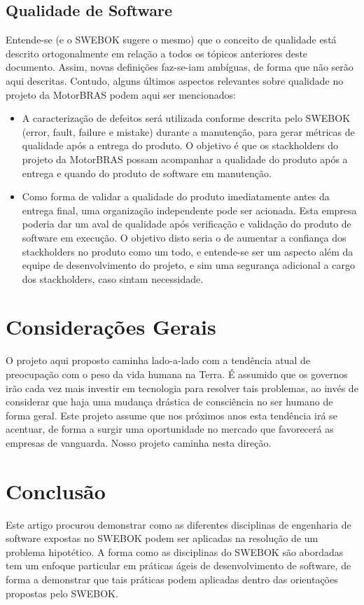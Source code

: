 \documentclass[12pt,journal,compsoc]{IEEEtran}
\begin{document}
\subsection{Qualidade de Software}

Entende-se (e o SWEBOK \cite{society_software_2004} sugere o mesmo) que o conceito de qualidade está descrito ortogonalmente em relação a todos os tópicos anteriores deste documento. Assim, novas de‌finições faz-se-iam ambíguas, de forma que não serão aqui descritas. Contudo, alguns últimos aspectos relevantes sobre qualidade no projeto da MotorBRAS podem aqui ser mencionados:

\begin{itemize}
\item A caracterização de defeitos será utilizada conforme descrita pelo SWEBOK \cite{society_software_2004} (error, fault, failure e mistake) durante a manutenção, para gerar métricas de qualidade após a entrega do produto. O objetivo é que os stackholders do projeto da MotorBRAS possam acompanhar a qualidade do produto após a entrega e quando do produto de software em manutenção.
\item Como forma de validar a qualidade do produto imediatamente antes da entrega final, uma organização independente pode ser acionada. Esta empresa poderia dar um aval de qualidade após verificação e validação do produto de software em execução. O objetivo disto seria o de aumentar a confiança dos stackholders no produto como um todo, e entende-se ser um aspecto além da equipe de desenvolvimento do projeto, e sim uma segurança adicional a cargo dos stackholders, caso sintam necessidade. 
\end{itemize}


\section{Considerações Gerais}

O projeto aqui proposto caminha lado-a-lado com a tendência atual de preocupação com o peso da vida humana na Terra. É assumido que os governos irão cada vez mais investir em tecnologia para resolver tais problemas, ao invés de considerar que haja uma mudança drástica de consciência no ser humano de forma geral. Este projeto assume que nos próximos anos esta tendência irá se acentuar, de forma a surgir uma oportunidade no mercado que favorecerá as empresas de vanguarda. Nosso projeto caminha nesta direção. 


\section{Conclusão}

Este artigo procurou demonstrar como as diferentes disciplinas de engenharia de software expostas no SWEBOK podem ser aplicadas na resolução de um problema hipotético. A forma como as disciplinas do SWEBOK são abordadas tem um enfoque particular em práticas ágeis de desenvolvimento de software, de forma a demonstrar que tais práticas podem aplicadas dentro das orientações propostas pelo SWEBOK.



\end{document}
